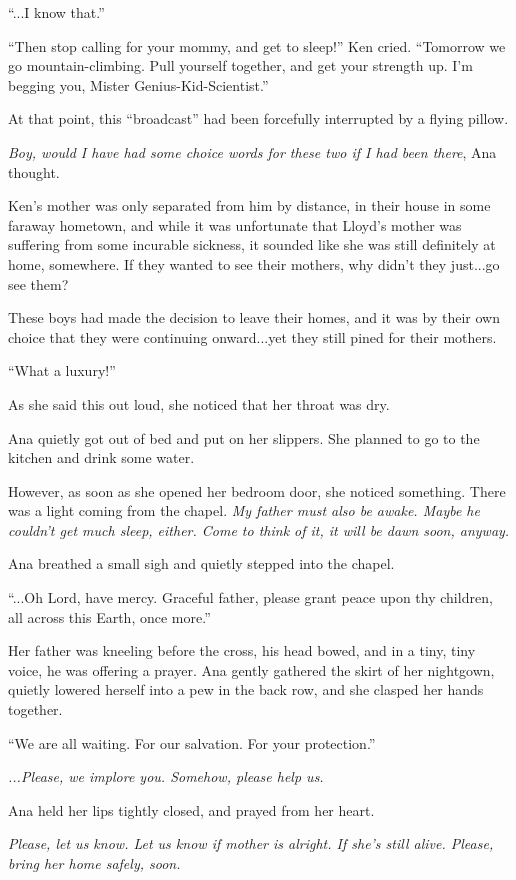 \documentclass[
]{article}
\begin{document}
``...I know that.''

``Then stop calling for your mommy, and get to sleep!'' Ken cried.
``Tomorrow we go mountain-climbing. Pull yourself together, and get your
strength up. I'm begging you, Mister Genius-Kid-Scientist.''

At that point, this ``broadcast'' had been forcefully interrupted by a
flying pillow.

\emph{Boy, would I have had some choice words for these two if I had
been there}, Ana thought.

Ken's mother was only separated from him by distance, in their house in
some faraway hometown, and while it was unfortunate that Lloyd's mother
was suffering from some incurable sickness, it sounded like she was
still definitely at home, somewhere. If they wanted to see their
mothers, why didn't they just...go see them?

These boys had made the decision to leave their homes, and it was by
their own choice that they were continuing onward...yet they still pined
for their mothers.

``What a luxury!''

As she said this out loud, she noticed that her throat was dry.

Ana quietly got out of bed and put on her slippers. She planned to go to
the kitchen and drink some water.

However, as soon as she opened her bedroom door, she noticed something.
There was a light coming from the chapel. \emph{My father must also be
awake. Maybe he couldn't get much sleep, either. Come to think of it, it
will be dawn soon, anyway.}

Ana breathed a small sigh and quietly stepped into the chapel.

``...Oh Lord, have mercy. Graceful father, please grant peace upon thy
children, all across this Earth, once more.''

Her father was kneeling before the cross, his head bowed, and in a tiny,
tiny voice, he was offering a prayer. Ana gently gathered the skirt of
her nightgown, quietly lowered herself into a pew in the back row, and
she clasped her hands together.

``We are all waiting. For our salvation. For your protection.''

\emph{...Please, we implore you. Somehow, please help us.}

Ana held her lips tightly closed, and prayed from her heart.

\emph{Please, let us know. Let us know if mother is alright. If she's
still alive. Please, bring her home safely, soon.}
\end{document}
